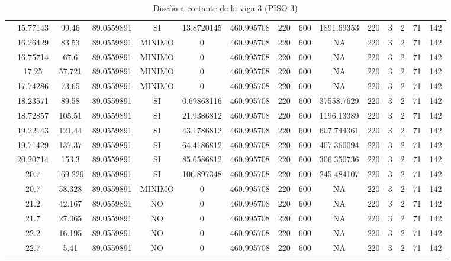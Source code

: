\begin{table}[H]
{\begin{tabular}{|c|c|c|c|c|c|c|c|c|c|c|c|c|c|c|}
\cline{2-15}    & 15.77143 & 99.46 & 89.0559891 & SI  & 13.8720145 & 460.995708 & 220 & 600 & 1891.69353 & 220 & 3   & 2   & 71  & 142 \bigstrut\\
\cline{2-15}    & 16.26429 & 83.53 & 89.0559891 & MINIMO & 0   & 460.995708 & 220 & 600 & NA  & 220 & 3   & 2   & 71  & 142 \bigstrut\\
\cline{2-15}    & 16.75714 & 67.6 & 89.0559891 & MINIMO & 0   & 460.995708 & 220 & 600 & NA  & 220 & 3   & 2   & 71  & 142 \bigstrut\\
\cline{2-15}    & 17.25 & 57.721 & 89.0559891 & MINIMO & 0   & 460.995708 & 220 & 600 & NA  & 220 & 3   & 2   & 71  & 142 \bigstrut\\
\cline{2-15}    & 17.74286 & 73.65 & 89.0559891 & MINIMO & 0   & 460.995708 & 220 & 600 & NA  & 220 & 3   & 2   & 71  & 142 \bigstrut\\
\cline{2-15}    & 18.23571 & 89.58 & 89.0559891 & SI  & 0.69868116 & 460.995708 & 220 & 600 & 37558.7629 & 220 & 3   & 2   & 71  & 142 \bigstrut\\
\cline{2-15}    & 18.72857 & 105.51 & 89.0559891 & SI  & 21.9386812 & 460.995708 & 220 & 600 & 1196.13389 & 220 & 3   & 2   & 71  & 142 \bigstrut\\
\cline{2-15}    & 19.22143 & 121.44 & 89.0559891 & SI  & 43.1786812 & 460.995708 & 220 & 600 & 607.744361 & 220 & 3   & 2   & 71  & 142 \bigstrut\\
\cline{2-15}    & 19.71429 & 137.37 & 89.0559891 & SI  & 64.4186812 & 460.995708 & 220 & 600 & 407.360094 & 220 & 3   & 2   & 71  & 142 \bigstrut\\
\cline{2-15}    & 20.20714 & 153.3 & 89.0559891 & SI  & 85.6586812 & 460.995708 & 220 & 600 & 306.350736 & 220 & 3   & 2   & 71  & 142 \bigstrut\\
\cline{2-15}    & 20.7 & 169.229 & 89.0559891 & SI  & 106.897348 & 460.995708 & 220 & 600 & 245.484107 & 220 & 3   & 2   & 71  & 142 \bigstrut\\
\cline{2-15}    & 20.7 & 58.328 & 89.0559891 & MINIMO & 0   & 460.995708 & 220 & 600 & NA  & 220 & 3   & 2   & 71  & 142 \bigstrut\\
\cline{2-15}    & 21.2 & 42.167 & 89.0559891 & NO  & 0   & 460.995708 & 220 & 600 & NA  & 220 & 3   & 2   & 71  & 142 \bigstrut\\
\cline{2-15}    & 21.7 & 27.065 & 89.0559891 & NO  & 0   & 460.995708 & 220 & 600 & NA  & 220 & 3   & 2   & 71  & 142 \bigstrut\\
\cline{2-15}    & 22.2 & 16.195 & 89.0559891 & NO  & 0   & 460.995708 & 220 & 600 & NA  & 220 & 3   & 2   & 71  & 142 \bigstrut\\
\cline{2-15}    & 22.7 & 5.41 & 89.0559891 & NO  & 0   & 460.995708 & 220 & 600 & NA  & 220 & 3   & 2   & 71  & 142 \bigstrut\\
\hline
\end{tabular}%


  

  }%
    \caption{Diseño a cortante de la viga 3 (PISO 3) }
  \label{tab:C VG3 P3 }%
\end{table}%
